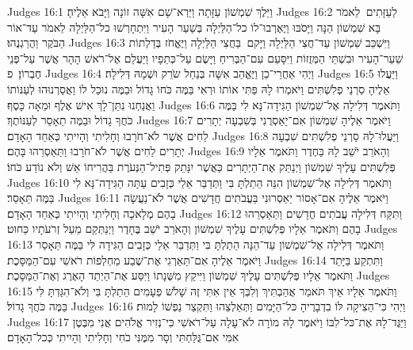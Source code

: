 Judges 16:1	וַיֵּלֶךְ שִׁמְשׁוֹן עַזָּתָה וַיַּרְא־שָׁם אִשָּׁה זוֹנָה וַיָּבֹא אֵלֶיהָ׃
Judges 16:2	לַעַזָּתִים  לֵאמֹר בָּא שִׁמְשׁוֹן הֵנָּה וַיָּסֹבּוּ וַיֶּאֶרְבוּ־לוֹ כל־הַלַּיְלָה בְּשַׁעַר הָעִיר וַיִּתְחָרְשׁוּ כל־הַלַּיְלָה לֵאמֹר עַד־אוֹר הַבֹּקֶר וַהֲרַגְנֻהוּ׃
Judges 16:3	וַיִּשְׁכַּב שִׁמְשׁוֹן עַד־חֲצִי הַלַּיְלָה וַיָּקם  בַּחֲצִי הַלַּיְלָה וַיֶּאֱחֹז בְּדַלְתוֹת שַׁעַר־הָעִיר וּבִשְׁתֵּי הַמְּזֻזוֹת וַיִּסָּעֵם עִם־הַבְּרִיחַ וַיָּשֶׂם עַל־כְּתֵפָיו וַיַּעֲלֵם אֶל־רֹאשׁ הָהָר אֲשֶׁר עַל־פְּנֵי חֶבְרוֹן׃ {פ}
Judges 16:4	וַיְהִי אַחֲרֵי־כֵן וַיֶּאֱהַב אִשָּׁה בְּנַחַל שֹׂרֵק וּשְׁמָהּ דְּלִילָה׃
Judges 16:5	וַיַּעֲלוּ אֵלֶיהָ סַרְנֵי פְלִשְׁתִּים וַיֹּאמְרוּ לָהּ פַּתִּי אוֹתוֹ וּרְאִי בַּמֶּה כֹּחוֹ גָדוֹל וּבַמֶּה נוּכַל לוֹ וַאֲסַרְנוּהוּ לְעַנּוֹתוֹ וַאֲנַחְנוּ נִתַּן־לָךְ אִישׁ אֶלֶף וּמֵאָה כָּסֶף׃
Judges 16:6	וַתֹּאמֶר דְּלִילָה אֶל־שִׁמְשׁוֹן הַגִּידָה־נָּא לִי בַּמֶּה כֹּחֲךָ גָדוֹל וּבַמֶּה תֵאָסֵר לְעַנּוֹתֶךָ׃
Judges 16:7	וַיֹּאמֶר אֵלֶיהָ שִׁמְשׁוֹן אִם־יַאַסְרֻנִי בְּשִׁבְעָה יְתָרִים לַחִים אֲשֶׁר לֹא־חֹרָבוּ וְחָלִיתִי וְהָיִיתִי כְּאַחַד הָאָדָם׃
Judges 16:8	וַיַּעֲלוּ־לָהּ סַרְנֵי פְלִשְׁתִּים שִׁבְעָה יְתָרִים לַחִים אֲשֶׁר לֹא־חֹרָבוּ וַתַּאַסְרֵהוּ בָּהֶם׃
Judges 16:9	וְהָאֹרֵב יֹשֵׁב לָהּ בַּחֶדֶר וַתֹּאמֶר אֵלָיו פְּלִשְׁתִּים עָלֶיךָ שִׁמְשׁוֹן וַיְנַתֵּק אֶת־הַיְתָרִים כַּאֲשֶׁר יִנָּתֵק פְּתִיל־הַנְּעֹרֶת בַּהֲרִיחוֹ אֵשׁ וְלֹא נוֹדַע כֹּחוֹ׃
Judges 16:10	וַתֹּאמֶר דְּלִילָה אֶל־שִׁמְשׁוֹן הִנֵּה הֵתַלְתָּ בִּי וַתְּדַבֵּר אֵלַי כְּזָבִים עַתָּה הַגִּידָה־נָּא לִי בַּמֶּה תֵּאָסֵר׃
Judges 16:11	וַיֹּאמֶר אֵלֶיהָ אִם־אָסוֹר יַאַסְרוּנִי בַּעֲבֹתִים חֲדָשִׁים אֲשֶׁר לֹא־נַעֲשָׂה בָהֶם מְלָאכָה וְחָלִיתִי וְהָיִיתִי כְּאַחַד הָאָדָם׃
Judges 16:12	וַתִּקַּח דְּלִילָה עֲבֹתִים חֲדָשִׁים וַתַּאַסְרֵהוּ בָהֶם וַתֹּאמֶר אֵלָיו פְּלִשְׁתִּים עָלֶיךָ שִׁמְשׁוֹן וְהָאֹרֵב יֹשֵׁב בֶּחָדֶר וַיְנַתְּקֵם מֵעַל זְרֹעֹתָיו כַּחוּט׃
Judges 16:13	וַתֹּאמֶר דְּלִילָה אֶל־שִׁמְשׁוֹן עַד־הֵנָּה הֵתַלְתָּ בִּי וַתְּדַבֵּר אֵלַי כְּזָבִים הַגִּידָה לִּי בַּמֶּה תֵּאָסֵר וַיֹּאמֶר אֵלֶיהָ אִם־תַּאַרְגִי אֶת־שֶׁבַע מַחְלְפוֹת רֹאשִׁי עִם־הַמַּסָּכֶת׃
Judges 16:14	וַתִּתְקַע בַּיָּתֵד וַתֹּאמֶר אֵלָיו פְּלִשְׁתִּים עָלֶיךָ שִׁמְשׁוֹן וַיִּיקַץ מִשְּׁנָתוֹ וַיִּסַּע אֶת־הַיְתַד הָאֶרֶג וְאֶת־הַמַּסָּכֶת׃
Judges 16:15	וַתֹּאמֶר אֵלָיו אֵיךְ תֹּאמַר אֲהַבְתִּיךְ וְלִבְּךָ אֵין אִתִּי זֶה שָׁלֹשׁ פְּעָמִים הֵתַלְתָּ בִּי וְלֹא־הִגַּדְתָּ לִּי בַּמֶּה כֹּחֲךָ גָדוֹל׃
Judges 16:16	וַיְהִי כִּי־הֵצִיקָה לּוֹ בִדְבָרֶיהָ כּל־הַיָּמִים וַתְּאַלְצֵהוּ וַתִּקְצַר נַפְשׁוֹ לָמוּת׃
Judges 16:17	וַיַּגֶּד־לָהּ אֶת־כּל־לִבּוֹ וַיֹּאמֶר לָהּ מוֹרָה לֹא־עָלָה עַל־רֹאשִׁי כִּי־נְזִיר אֱלֹהִים אֲנִי מִבֶּטֶן אִמִּי אִם־גֻּלַּחְתִּי וְסָר מִמֶּנִּי כֹחִי וְחָלִיתִי וְהָיִיתִי כְּכל־הָאָדָם׃
